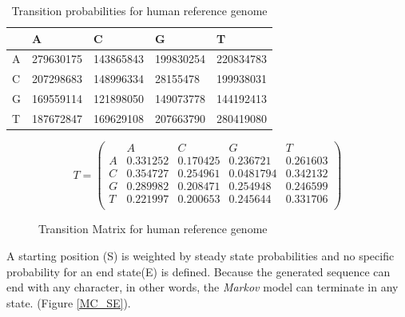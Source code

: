 \documentclass[11pt,a4paper]{report}
\begin{document}
\begin{table}[h]
  \begin{tabular}{ |  p{1cm} | p{2cm} | p{2cm} | p{2cm} | p{2cm} |}
    \hline
  	  
 	             & A   & C & G & T \\ \hline
      A  & 279630175  & 143865843 & 199830254 & 220834783 \\ \hline
 	  C	 & 207298683  & 148996334 & 28155478 & 199938031\\ \hline
 	  G	 & 169559114  & 121898050 & 149073778 & 144192413\\ \hline
 	  T  & 187672847  & 169629108  & 207663790 & 280419080\\ \hline
      
 	  
   \end{tabular}
  \caption{Transition probabilities for human reference genome}
 \label{transition-table}
\end{table}



\begin{figure}[H]
 \centering
\[
T = 
 \begin{pmatrix}
   &  A  & C & G & T  \\
 A & 0.331252 & 0.170425 & 0.236721 & 0.261603  \\
 C & 0.354727 & 0.254961 & 0.0481794 & 0.342132  \\
 G & 0.289982 & 0.208471 & 0.254948 & 0.246599  \\
 T & 0.221997 & 0.200653 & 0.245644 & 0.331706 \\
  
 \end{pmatrix}
\]
 \caption{Transition Matrix for human reference genome}
 \label{transition-matrix}
\end{figure}


A starting position (S) is weighted by steady state probabilities
and no specific probability for an end state(E) is defined. 
Because the generated sequence can end with any character, 
in other words, the \emph{Markov} model can terminate in any state. 
(Figure \ref{MC_SE}).
\end{document}
